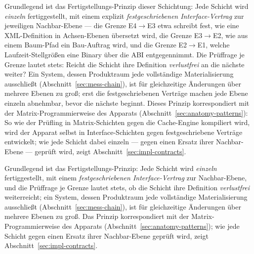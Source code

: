 \begin{nurlang}
Grundlegend ist das Fertigstellungs-Prinzip dieser Schichtung: Jede Schicht wird \emph{einzeln}
fertiggestellt, mit einem explizit \emph{festgeschriebenen Interface-Vertrag} zur jeweiligen Nachbar-Ebene
--- die Grenze E4$\to$E3 etwa schreibt fest, wie eine XML-Definition in Achsen-Ebenen übersetzt wird, die
Grenze E3$\to$E2, wie aus einem Baum-Pfad ein Bau-Auftrag wird, und die Grenze E2$\to$E1, welche
Laufzeit-Stellgrößen eine Binary über die ABI entgegennimmt. Die Prüffrage je Grenze lautet stets:
Reicht die Schicht ihre Definition \emph{verlustfrei} an die nächste weiter? Ein System, dessen
Produktraum jede vollständige Materialisierung ausschließt (Abschnitt~\ref{sec:mess-chain}), ist
für gleichzeitige Änderungen über mehrere Ebenen zu
groß; erst die festgeschriebenen Verträge machen jede Ebene einzeln abnehmbar, bevor die nächste beginnt.
Dieses Prinzip korrespondiert mit der Matrix-Programmierweise des Apparats
(Abschnitt~\ref{sec:anatomy-patterns}): So wie der Prüfling in Matrix-Schichten gegen die Cache-Engine
kompiliert wird, wird der Apparat selbst in Interface-Schichten gegen festgeschriebene Verträge entwickelt;
wie jede Schicht dabei einzeln --- gegen einen Ersatz ihrer Nachbar-Ebene --- geprüft wird, zeigt
Abschnitt~\ref{sec:impl-contracts}.
\end{nurlang}
\begin{nurkurz}
Grundlegend ist das Fertigstellungs-Prinzip: Jede Schicht wird \emph{einzeln} fertiggestellt, mit einem
\emph{festgeschriebenen Interface-Vertrag} zur Nachbar-Ebene, und die Prüffrage je Grenze lautet stets, ob die
Schicht ihre Definition \emph{verlustfrei} weiterreicht; ein System, dessen Produktraum jede vollständige
Materialisierung ausschließt (Abschnitt~\ref{sec:mess-chain}), ist für gleichzeitige Änderungen über mehrere
Ebenen zu groß. Das Prinzip korrespondiert mit der Matrix-Programmierweise des Apparats
(Abschnitt~\ref{sec:anatomy-patterns}); wie jede Schicht gegen einen Ersatz ihrer Nachbar-Ebene geprüft wird,
zeigt Abschnitt~\ref{sec:impl-contracts}.
\end{nurkurz}

